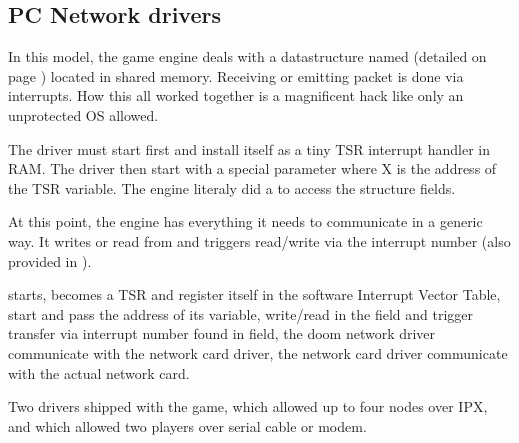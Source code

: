 




\subsection{PC Network drivers}
In this model, the game engine deals with a datastructure named  (detailed on page \pageref{doomcom_t.c}) located in shared memory. Receiving or emitting packet is done via interrupts. How this all worked together is a magnificent hack like only an unprotected OS allowed.\\
\par
The driver must start first and install itself as a tiny TSR interrupt handler in RAM. The driver then start  with a special parameter  where X is the address of the TSR  variable. The engine literaly did a  to access the structure fields.\\
\par

\par
 At this point, the engine has everything it needs to communicate in a generic way. It writes or read from  and triggers read/write via the interrupt number (also provided in ).\\
\par
{}
\par
{}  starts, becomes a TSR and register itself in the software Interrupt Vector Table,   start  and pass the address of its  variable,   write/read in the   field and trigger transfer via interrupt number found in  field,  the doom network driver communicate with the network card driver,  the network card driver communicate with the actual network card.\\
\par
Two drivers shipped with the game,  which allowed up to four nodes over IPX, and  which allowed two players over serial cable or modem.






